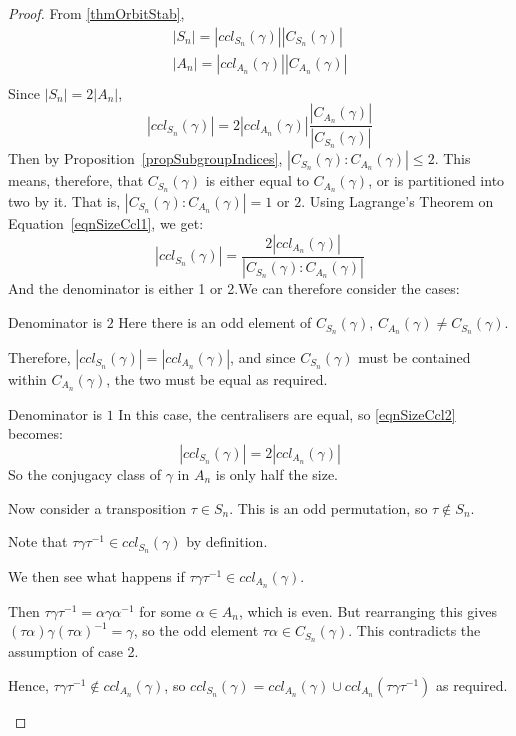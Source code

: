 \documentclass[../Main.tex]{subfiles}
\begin{document}
\begin{proof}
    From \ref{thmOrbitStab}, 
    \begin{align*}
        |S_n| = |ccl_{S_n}(\gamma)||C_{S_n}(\gamma)| \\
        |A_n| = |ccl_{A_n}(\gamma)||C_{A_n}(\gamma)| \\
    \end{align*}
    Since $|S_n| = 2|A_n|$,
    \begin{equation}
        |ccl_{S_n}(\gamma)| = 2|ccl_{A_n}(\gamma)|\frac{|C_{A_n}(\gamma)|}{|C_{S_n}(\gamma)|}
        \label{eqnSizeCcl1}
    \end{equation}
    Then by Proposition~\ref{propSubgroupIndices}, $|C_{S_n}(\gamma) : C_{A_n}(\gamma)| \leq 2$. This means, therefore, that $C_{S_n}(\gamma)$ is either equal to $C_{A_n}(\gamma)$, or is partitioned into two by it. That is, $|C_{S_n}(\gamma) : C_{A_n}(\gamma)| = 1$ or $2$. Using Lagrange's Theorem on Equation~\ref{eqnSizeCcl1}, we get:
    \begin{equation}
        |ccl_{S_n}(\gamma)| = \frac{2|ccl_{A_n}(\gamma)|}{|C_{S_n}(\gamma) : C_{A_n}(\gamma)|}
        \label{eqnSizeCcl2}
    \end{equation}
    And the denominator is either 1 or 2.We can therefore consider the cases:\par
    \begin{case}{Denominator is $2$}
        Here there is an odd element of $C_{S_n}(\gamma)$, $C_{A_n}(\gamma) \neq C_{S_n}(\gamma)$.\par
        Therefore, $|ccl_{S_n}(\gamma)| = |ccl_{A_n}(\gamma)|$, and since $C_{S_n}(\gamma)$ must be contained within $C_{A_n}(\gamma)$, the two must be equal as required.\par
    \end{case}
    \begin{case}{Denominator is $1$}
        In this case, the centralisers are equal, so \ref{eqnSizeCcl2} becomes:
        \begin{equation*}
            |ccl_{S_n}(\gamma)| = 2|ccl_{A_n}(\gamma)|
        \end{equation*}
        So the conjugacy class of $\gamma$ in $A_n$ is only half the size.\par
        Now consider a transposition $\tau \in S_n$. This is an odd permutation, so $\tau \notin S_n$.\par
        Note that $\tau\gamma\tau^{-1} \in ccl_{S_n}(\gamma)$ by definition.\par
        We then see what happens if $\tau\gamma\tau^{-1} \in ccl_{A_n}(\gamma)$.\par
        Then $\tau\gamma\tau^{-1} = \alpha\gamma\alpha^{-1}$ for some $\alpha \in A_n$, which is even. But rearranging this gives $(\tau\alpha)\gamma(\tau\alpha)^{-1} = \gamma$, so the odd element $\tau\alpha \in C_{S_n}(\gamma)$. This contradicts the assumption of case 2.\par
        Hence, $\tau\gamma\tau^{-1} \notin ccl_{A_n}(\gamma)$, so $ccl_{S_n}(\gamma) = ccl_{A_n}(\gamma) \cup ccl_{A_n}(\tau\gamma\tau^{-1})$ as required.
    \end{case}
\end{proof}
\end{document}
